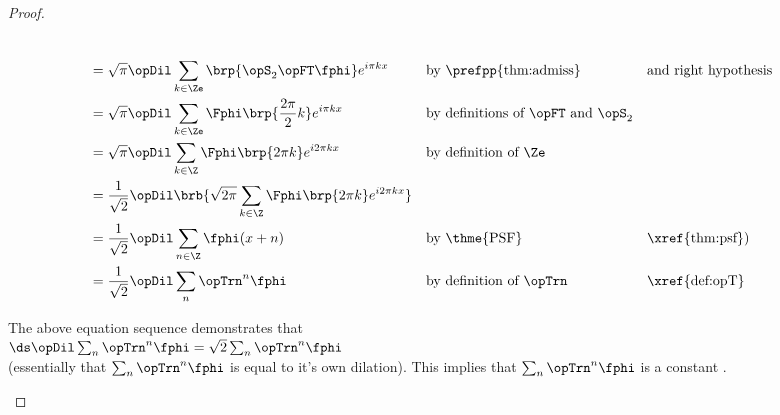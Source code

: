 \begin{proof}
\begin{enumerate}
\begin{align*}
{       }%
  \\&= \sqrt{\pi} \opDil \sum_{k\in\Ze} \brp{\opS_2 \opFT\fphi} e^{i\pi kx} 
    && \text{by \prefpp{thm:admiss}}&& \text{and right hypothesis}
  \\&= \sqrt{\pi} \opDil \sum_{k\in\Ze} \Fphi\brp{\frac{2\pi}{2}k} e^{i\pi kx} 
    && \text{by definitions of $\opFT$ and $\opS_2$}
  \\&= \sqrt{\pi} \opDil \sum_{k\in\Z} \Fphi\brp{2\pi k} e^{i2\pi kx} 
    && \text{by definition of $\Ze$}
  \\&= \frac{1}{\sqrt{2}}\opDil \brb{\sqrt{2\pi} \sum_{k\in\Z} \Fphi\brp{2\pi k} e^{i2\pi kx}} 
  \\&= \frac{1}{\sqrt{2}}\opDil \sum_{n\in\Z}\fphi(x+n)
    && \text{by \thme{PSF}} && \text{\xref{thm:psf})}
  \\&= \frac{1}{\sqrt{2}}\opDil \sum_{n}\opTrn^n\fphi
    && \text{by definition of $\opTrn$} && \text{\xref{def:opT}}
\end{align*}

The above equation sequence demonstrates that 
  \\\indentx$\ds\opDil\sum_n\opTrn^n\fphi = \sqrt{2}\sum_n\opTrn^n\fphi$\\
(essentially that $\sum_n\opTrn^n\fphi$ is equal to it's own dilation).
This implies that $\sum_n\opTrn^n\fphi$ is a constant .


\end{enumerate}
\end{proof}
